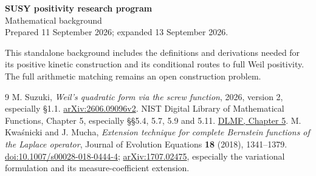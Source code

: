 \documentclass[11pt]{article}
\numberwithin{equation}{section}
\begin{document}
\begin{center}
{\Large\bfseries SUSY positivity research program}\\[4pt]
{\large Mathematical background}\\[6pt]
{\small Prepared 11 September 2026; expanded 13 September 2026.}
\end{center}
\noindent This standalone background includes the definitions and
derivations needed for its positive kinetic construction and its
conditional routes to full Weil positivity. The full arithmetic matching remains an open construction problem.
\medskip

\begin{thebibliography}{9}
M. Suzuki, \emph{Weil's quadratic form via the screw function}, 2026,
version 2, especially \S1.1.
\href{https://arxiv.org/abs/2606.09096v2}{arXiv:2606.09096v2}.
NIST Digital Library of Mathematical Functions, Chapter 5,
especially \S\S5.4, 5.7, 5.9 and 5.11.
\href{https://dlmf.nist.gov/5}{DLMF, Chapter 5}.
M. Kwa\'snicki and J. Mucha,
\emph{Extension technique for complete Bernstein functions of the Laplace operator},
Journal of Evolution Equations \textbf{18} (2018), 1341--1379.
\href{https://doi.org/10.1007/s00028-018-0444-4}{doi:10.1007/s00028-018-0444-4};
\href{https://arxiv.org/abs/1707.02475}{arXiv:1707.02475},
especially the variational formulation and its measure-coefficient extension.
\end{thebibliography}
\end{document}
